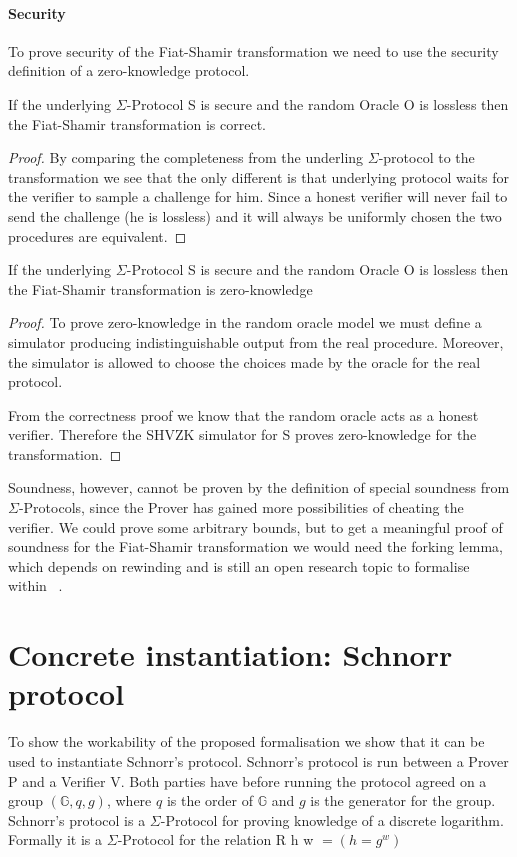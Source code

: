 \paragraph{Security}
To prove security of the Fiat-Shamir transformation we need to use the security
definition of a zero-knowledge protocol.

\begin{lemma}
  If the underlying $\Sigma$-Protocol S is secure and the random Oracle O is
  lossless then the Fiat-Shamir transformation is correct.
\end{lemma}
\begin{proof}
  By comparing the completeness from the underling $\Sigma$-protocol to the
  transformation we see that the only different is that underlying protocol
  waits for the verifier to sample a challenge for him. Since a honest verifier
  will never fail to send the challenge (\ie he is lossless) and it will always
  be uniformly chosen the two procedures are equivalent.
\end{proof}

\begin{lemma}
  If the underlying $\Sigma$-Protocol S is secure and the random Oracle O is
  lossless then the Fiat-Shamir transformation is zero-knowledge
\end{lemma}
\begin{proof}
  To prove zero-knowledge in the random oracle model we must define a simulator
  producing indistinguishable output from the real procedure. Moreover, the
  simulator is allowed to choose the choices made by the oracle for the real
  protocol.

  From the correctness proof we know that the random oracle acts as a honest
  verifier. Therefore the SHVZK simulator for S proves zero-knowledge for the transformation.
\end{proof}

Soundness, however, cannot be proven by the definition of special soundness from
$\Sigma$-Protocols, since the Prover has gained more possibilities of cheating
the verifier. We could prove some arbitrary bounds, but to get a meaningful
proof of soundness for the Fiat-Shamir transformation we would need the
forking lemma, which depends on rewinding and is still an open research topic to formalise within \easycrypt\ \cite{ec_intro}.

\section{Concrete instantiation: Schnorr protocol}
\label{sec:schnorr}
To show the workability of the proposed formalisation we show that it can be
used to instantiate Schnorr's protocol.
Schnorr's protocol is run between a Prover P and a
Verifier V. Both parties have before running the protocol agreed on a group
$(\mathbb{G}, q, g)$, where $q$ is the order of $\mathbb{G}$ and $g$ is the
generator for the group.
Schnorr's protocol is a $\Sigma$-Protocol for proving knowledge of a discrete
logarithm. Formally it is a $\Sigma$-Protocol for the relation R h w $= (h = g^{w})$

